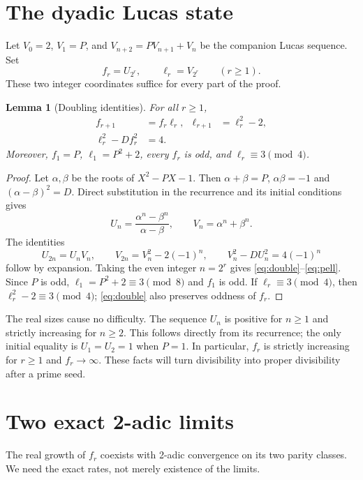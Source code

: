 \documentclass[11pt,a4paper]{article}
\newtheorem{lemma}[theorem]{Lemma}
\theoremstyle{definition}\newtheorem{definition}[theorem]{Definition}
\theoremstyle{remark}\newtheorem{remark}[theorem]{Remark}
\begin{document}
\section{The dyadic Lucas state}
Let $V_0=2$, $V_1=P$, and $V_{n+2}=PV_{n+1}+V_n$ be the companion
Lucas sequence. Set
\[
 f_r=U_{2^r},\qquad \ell_r=V_{2^r}\qquad(r\ge1).
\]
These two integer coordinates suffice for every part of the proof.

\begin{lemma}[Doubling identities]\label{lem:double}
For all $r\ge1$,
\begin{align}
 f_{r+1}&=f_r\ell_r, &
 \ell_{r+1}&=\ell_r^2-2,\label{eq:double}\\
 \ell_r^2-Df_r^2&=4.\label{eq:pell}
\end{align}
Moreover, $f_1=P$, $\ell_1=P^2+2$, every $f_r$ is odd, and
$\ell_r\equiv3\pmod4$.
\end{lemma}
\begin{proof}
Let $\alpha,\beta$ be the roots of $X^2-PX-1$. Then
$\alpha+\beta=P$, $\alpha\beta=-1$ and
$(\alpha-\beta)^2=D$. Direct substitution in the recurrence and its
initial conditions gives
\[
 U_n=\frac{\alpha^n-\beta^n}{\alpha-\beta},\qquad
 V_n=\alpha^n+\beta^n.
\]
The identities
\[
 U_{2n}=U_nV_n,\qquad
 V_{2n}=V_n^2-2(-1)^n,\qquad
 V_n^2-DU_n^2=4(-1)^n
\]
follow by expansion. Taking the even integer $n=2^r$ gives
\eqref{eq:double}--\eqref{eq:pell}. Since $P$ is odd,
$\ell_1=P^2+2\equiv3\pmod8$ and $f_1$ is odd.
If $\ell_r\equiv3\pmod4$, then $\ell_r^2-2\equiv3\pmod4$;
\eqref{eq:double} also preserves oddness of $f_r$.
\end{proof}

The real sizes cause no difficulty. The sequence $U_n$ is positive
for $n\ge1$ and strictly increasing for $n\ge2$. This follows directly
from its recurrence; the only initial equality is $U_1=U_2=1$ when
$P=1$. In particular, $f_r$ is strictly increasing for $r\ge1$ and
$f_r\to\infty$. These facts will turn divisibility into proper
divisibility after a prime seed.

\section{Two exact 2-adic limits}
The real growth of $f_r$ coexists with 2-adic convergence on its two
parity classes. We need the exact rates, not merely existence of the
limits.
\end{document}
